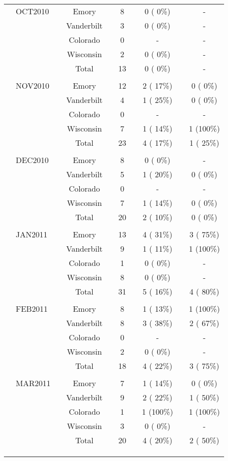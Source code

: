 \documentclass[dvips, 10pt]{article}
\begin{document}
\begin{table}[t]
\begin{center}
\begin{tabular}{ @{}l@{}
@{}l@{}@{}p{1.5em}@{}@{}c@{}@{}p{1.5em}@{}@{}c@{}@{}p{1.5em}@{}@{}c@{}@{}p{1.5em}@{}@{}c@{}
}
\\
& OCT2010 && Emory && 8 && 0 (  0\%) && - \\
&  && Vanderbilt && 3 && 0 (  0\%) && - \\
&  && Colorado && 0 && - && - \\
&  && Wisconsin && 2 && 0 (  0\%) && - \\
&  && Total && 13 && 0 (  0\%) && - \\
&  &&  &&  &&  &&  \\
& NOV2010 && Emory && 12 && 2 ( 17\%) && 0 (  0\%) \\
&  && Vanderbilt && 4 && 1 ( 25\%) && 0 (  0\%) \\
&  && Colorado && 0 && - && - \\
&  && Wisconsin && 7 && 1 ( 14\%) && 1 (100\%) \\
&  && Total && 23 && 4 ( 17\%) && 1 ( 25\%) \\
&  &&  &&  &&  &&  \\
& DEC2010 && Emory && 8 && 0 (  0\%) && - \\
&  && Vanderbilt && 5 && 1 ( 20\%) && 0 (  0\%) \\
&  && Colorado && 0 && - && - \\
&  && Wisconsin && 7 && 1 ( 14\%) && 0 (  0\%) \\
&  && Total && 20 && 2 ( 10\%) && 0 (  0\%) \\
&  &&  &&  &&  &&  \\
& JAN2011 && Emory && 13 && 4 ( 31\%) && 3 ( 75\%) \\
&  && Vanderbilt && 9 && 1 ( 11\%) && 1 (100\%) \\
&  && Colorado && 1 && 0 (  0\%) && - \\
&  && Wisconsin && 8 && 0 (  0\%) && - \\
&  && Total && 31 && 5 ( 16\%) && 4 ( 80\%) \\
&  &&  &&  &&  &&  \\
& FEB2011 && Emory && 8 && 1 ( 13\%) && 1 (100\%) \\
&  && Vanderbilt && 8 && 3 ( 38\%) && 2 ( 67\%) \\
&  && Colorado && 0 && - && - \\
&  && Wisconsin && 2 && 0 (  0\%) && - \\
&  && Total && 18 && 4 ( 22\%) && 3 ( 75\%) \\
&  &&  &&  &&  &&  \\
& MAR2011 && Emory && 7 && 1 ( 14\%) && 0 (  0\%) \\
&  && Vanderbilt && 9 && 2 ( 22\%) && 1 ( 50\%) \\
&  && Colorado && 1 && 1 (100\%) && 1 (100\%) \\
&  && Wisconsin && 3 && 0 (  0\%) && - \\
&  && Total && 20 && 4 ( 20\%) && 2 ( 50\%) \\
&  &&  &&  &&  &&  \\
\\
\hline \\


\end{tabular}
\end{center}
\end{table}
\end{document}
